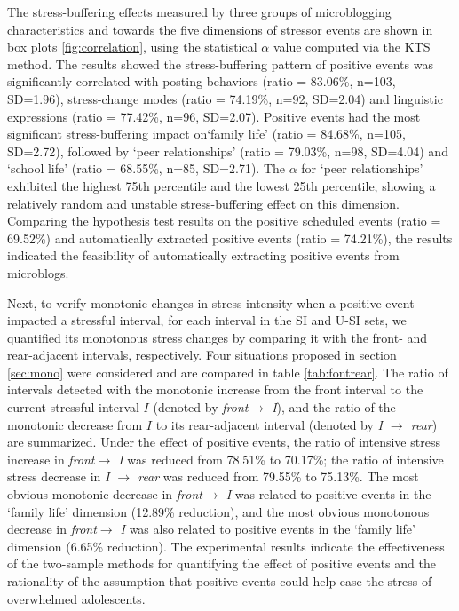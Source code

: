 \documentclass[5p,times,numbers,authoryear]{elsarticle}
\begin{document}
The stress-buffering effects measured by three groups of microblogging characteristics and towards the five dimensions of stressor events are shown in box plots \ref{fig:correlation},
using the statistical $\alpha$ value computed via the KTS method.
The results showed the stress-buffering pattern of positive events
was significantly correlated with posting behaviors (ratio = 83.06\%, n=103, SD=1.96),
stress-change modes (ratio = 74.19\%, n=92, SD=2.04) and linguistic expressions (ratio = 77.42\%, n=96, SD=2.07).
Positive events had the most significant stress-buffering impact on`family life' (ratio = 84.68\%, n=105, SD=2.72),
followed by `peer relationships' (ratio = 79.03\%, n=98, SD=4.04) and `school life' (ratio = 68.55\%, n=85, SD=2.71).
The $\alpha$ for `peer relationships'
exhibited the highest 75th percentile and the lowest 25th percentile,
showing a relatively random and unstable stress-buffering effect on this dimension.
Comparing the hypothesis test results on the positive scheduled events (ratio = 69.52\%)
and automatically extracted positive events (ratio = 74.21\%),
the results indicated the feasibility of automatically extracting positive events from microblogs.

Next, to verify monotonic changes in stress intensity when a positive event impacted a stressful interval, for each interval in the SI and U-SI sets,
we quantified its monotonous stress changes by comparing it with the front- and rear-adjacent intervals, respectively.
Four situations proposed in section \ref{sec:mono} were considered and are compared in table \ref{tab:fontrear}.
The ratio of intervals detected with the monotonic increase from the front interval to the current stressful interval $I$ (denoted by \emph{front$ \rightarrow$ I}),
and the ratio of the monotonic decrease from $I$ to its rear-adjacent interval (denoted by \emph{I $\rightarrow$ rear}) are summarized.
Under the effect of positive events,
the ratio of intensive stress increase in \emph{front$ \rightarrow$ I} was reduced from 78.51\% to 70.17\%;
the ratio of intensive stress decrease in \emph{I $\rightarrow$ rear} was reduced from 79.55\% to 75.13\%.
The most obvious monotonic decrease in \emph{front$ \rightarrow$ I} was related to positive events in the `family life' dimension (12.89\% reduction),
and the most obvious monotonous decrease in \emph{front$ \rightarrow$ I} was also related to positive events in the `family life' dimension (6.65\% reduction).
The experimental results indicate the effectiveness of the two-sample methods for quantifying the effect of positive events and the rationality of the assumption that positive events could help ease the stress of overwhelmed adolescents.
\end{document}
